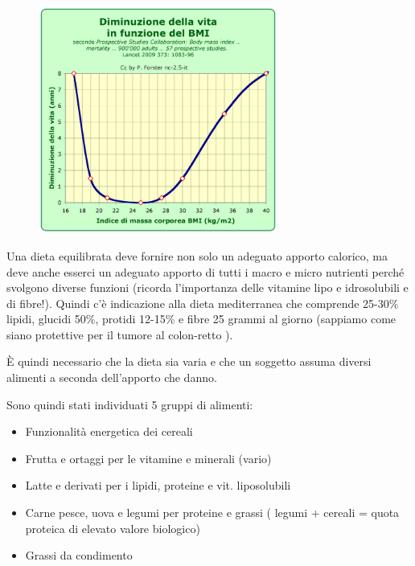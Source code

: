 \begin{figure}[!ht]
\centering
	\includegraphics[width=0.7\textwidth]{20/image7.png}
	\end{figure}

Una dieta equilibrata deve fornire non solo un adeguato apporto
calorico, ma deve anche esserci un adeguato apporto di tutti i macro e
micro nutrienti perché svolgono diverse funzioni (ricorda l'importanza
delle vitamine lipo e idrosolubili e di fibre!). Quindi c'è indicazione
alla dieta mediterranea che comprende 25-30\% lipidi, glucidi 50\%,
protidi 12-15\% e fibre 25 grammi al giorno (sappiamo come siano
protettive per il tumore al colon-retto ).

È quindi necessario che la dieta sia varia e che un soggetto assuma
diversi alimenti a seconda dell'apporto che danno.

Sono quindi stati individuati 5 gruppi di alimenti:

\begin{itemize}
\item
  Funzionalità energetica dei cereali
\item
  Frutta e ortaggi per le vitamine e minerali (vario)
\item
  Latte e derivati per i lipidi, proteine e vit. liposolubili
\item
  Carne pesce, uova e legumi per proteine e grassi ( legumi + cereali =
  quota proteica di elevato valore biologico)
\item
  Grassi da condimento
\end{itemize}

